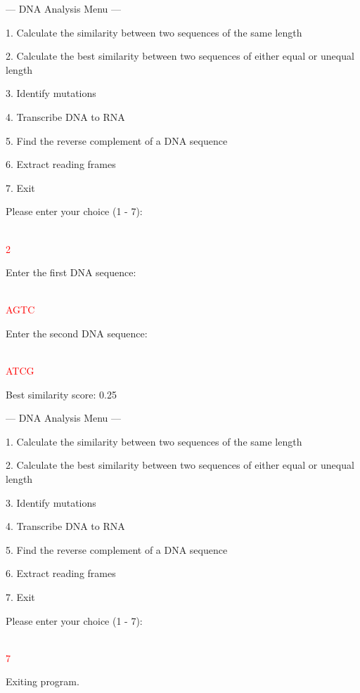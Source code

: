 \begin{sample}

    --- DNA Analysis Menu ---
    
    1. Calculate the similarity between two sequences of the same length
    
    2. Calculate the best similarity between two sequences of either equal or unequal length
    
    3. Identify mutations
    
    4. Transcribe DNA to RNA
    
    5. Find the reverse complement of a DNA sequence
    
    6. Extract reading frames
    
    7. Exit
    
    Please enter your choice (1 - 7): 
    
    \\\textcolor{red}{2}

    Enter the first DNA sequence:

    \\\textcolor{red}{AGTC}

    Enter the second DNA sequence: 

    \\\textcolor{red}{ATCG}

    Best similarity score: 0.25
    
    --- DNA Analysis Menu ---
    
    1. Calculate the similarity between two sequences of the same length
   
    2. Calculate the best similarity between two sequences of either equal or unequal length
    
    3. Identify mutations
    
    4. Transcribe DNA to RNA
    
    5. Find the reverse complement of a DNA sequence
    
    6. Extract reading frames
    
    7. Exit
    
    Please enter your choice (1 - 7): 
    
    \\\textcolor{red}{7}
    
    Exiting program.
\end{sample}


